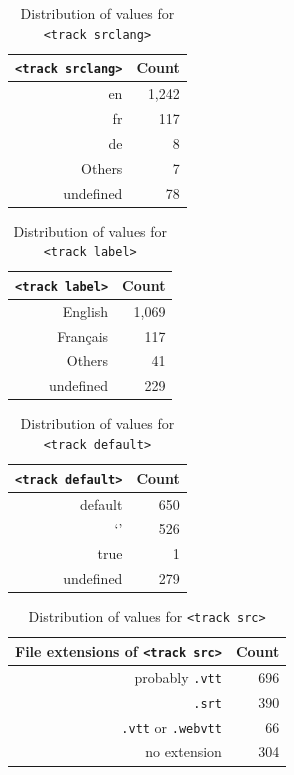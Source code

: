 \documentclass{sig-alternate}
\begin{document}
\begin{table}[b!]
  \raggedleft
  \footnotesize
  \begin{tabular}{ r | r }                       
    \texttt{<track srclang>} & Count \\
    \hline  
    en & 1,242\\
    fr & 117\\
    de & 8\\    
    Others & 7\\
    undefined & 78\\    
  \end{tabular}
  \caption{Distribution of values for
    \texttt{<track srclang>}}
  \label{table:srclang}    
\end{table}

\begin{table}[b!]
  \raggedleft
  \footnotesize  
  \begin{tabular}{ r | r }                       
    \texttt{<track label>} & Count \\
    \hline  
    English & 1,069\\
    Français & 117\\    
    Others & 41\\
    undefined & 229\\
  \end{tabular}
  \caption{Distribution of values for
    \texttt{<track label>}}
  \label{table:label}    
\end{table}
  
\begin{table}[b!]
  \raggedleft
  \footnotesize  
  \begin{tabular}{ r | r }                       
    \texttt{<track default>} & Count \\
    \hline
    default & 650\\
    `' & 526\\
    true & 1\\
    undefined & 279
  \end{tabular}
  \caption{Distribution of values for
    \texttt{<track default>}}
  \label{table:default}    
\end{table}

\begin{table}[b!]
  \raggedleft
  \footnotesize  
  \begin{tabular}{ r | r }                       
    File extensions of \texttt{<track src>} & Count \\
    \hline
    probably \texttt{.vtt} & 696\\
    \texttt{.srt} & 390\\
    \texttt{.vtt} or \texttt{.webvtt} & 66\\
    no extension & 304\\
  \end{tabular}
  \caption{Distribution of values for \texttt{<track src>}}
  \label{table:src}    
\end{table}
\end{document}
